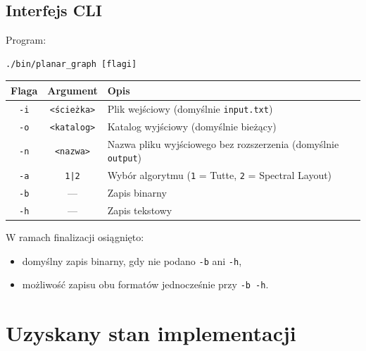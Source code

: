 \documentclass[12pt]{article}
\begin{document}
\subsection{Interfejs CLI}
Program:
\begin{verbatim}
./bin/planar_graph [flagi]
\end{verbatim}

\begin{center}
	\begin{tabular}{|c|c|p{7.5cm}|}
		\hline
		\textbf{Flaga} & \textbf{Argument}  & \textbf{Opis}                                                        \\
		\hline
		\texttt{-i}    & \texttt{<ścieżka>} & Plik wejściowy (domyślnie \texttt{input.txt})                        \\
		\hline
		\texttt{-o}    & \texttt{<katalog>} & Katalog wyjściowy (domyślnie bieżący)                                \\
		\hline
		\texttt{-n}    & \texttt{<nazwa>}   & Nazwa pliku wyjściowego bez rozszerzenia (domyślnie \texttt{output}) \\
		\hline
		\texttt{-a}    & \texttt{1|2}       & Wybór algorytmu (\texttt{1} = Tutte, \texttt{2} = Spectral Layout)   \\
		\hline
		\texttt{-b}    & —                  & Zapis binarny                                                        \\
		\hline
		\texttt{-h}    & —                  & Zapis tekstowy                                                       \\
		\hline
	\end{tabular}
\end{center}

W ramach finalizacji osiągnięto:
\begin{itemize}
	\item domyślny zapis binarny, gdy nie podano \texttt{-b} ani \texttt{-h},
	\item możliwość zapisu obu formatów jednocześnie przy \texttt{-b -h}.
\end{itemize}

\section{Uzyskany stan implementacji}
\end{document}
